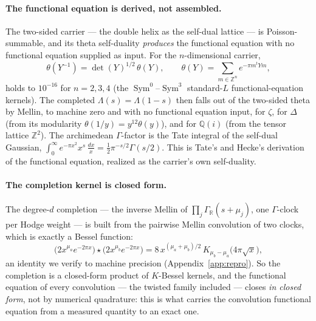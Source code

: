 \documentclass[11pt]{article}
\theoremstyle{definition}
\newcommand{\Sym}{\operatorname{Sym}}
\begin{document}
\paragraph{The functional equation is derived, not assembled.} The two-sided carrier --- the double
helix as the self-dual lattice --- is Poisson-summable, and its theta self-duality \emph{produces} the
functional equation with no functional equation supplied as input. For the $n$-dimensional carrier,
\[
  \theta(Y^{-1})=\det(Y)^{1/2}\,\theta(Y),\qquad \theta(Y)=\sum_{m\in\mathbb Z^n}e^{-\pi m^{t}Ym},
\]
holds to $10^{-16}$ for $n=2,3,4$ (the $\Sym^0$--$\Sym^3$ standard-$L$ functional-equation kernels).
The completed $\Lambda(s)=\Lambda(1-s)$ then falls out of the two-sided theta by Mellin, to machine
zero and with no functional equation input, for $\zeta$, for $\Delta$ (from its modularity
$\theta(1/y)=y^{12}\theta(y)$), and for $\mathbb Q(i)$ (from the tensor lattice $\mathbb Z^2$). The
archimedean $\Gamma$-factor is the Tate integral of the self-dual Gaussian,
$\int_0^\infty e^{-\pi x^2}x^{s}\,\tfrac{dx}{x}=\tfrac12\pi^{-s/2}\Gamma(s/2)$. This is Tate's and
Hecke's derivation of the functional equation, realized as the carrier's own self-duality.

\paragraph{The completion kernel is closed form.} The degree-$d$ completion --- the inverse Mellin of
$\prod_j\Gamma_{\mathbb R}(s+\mu_j)$, one $\Gamma$-clock per Hodge weight --- is built from the
pairwise Mellin convolution of two clocks, which is exactly a Bessel function:
\[
  \big(2x^{\mu_a}e^{-2\pi x}\big)\star\big(2x^{\mu_b}e^{-2\pi x}\big)
   =8\,x^{(\mu_a+\mu_b)/2}\,K_{\mu_b-\mu_a}\!\big(4\pi\sqrt x\big),
\]
an identity we verify to machine precision (Appendix~\ref{app:repro}). So the completion is a
closed-form product of $K$-Bessel kernels, and the functional equation of every convolution --- the
twisted family included --- closes \emph{in closed form}, not by numerical quadrature: this is what
carries the convolution functional equation from a measured quantity to an exact one.
\end{document}
